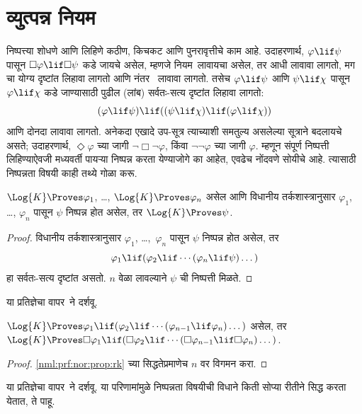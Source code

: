 \section{व्युत्पन्न नियम}\label{nml:prf:der:sec}

निष्पत्त्या शोधणे आणि लिहिणे कठीण, किचकट
आणि पुनरावृत्तीचे काम आहे. उदाहरणार्थ, $\varphi \lif \psi$
पासून $\Box \varphi \lif \Box \psi$ कडे जायचे असेल,
म्हणजे नियम~\RK लावायचा असेल, तर आधी \Nec लावावा लागतो,
मग~ चा योग्य दृष्टांत लिहावा लागतो आणि नंतर~\MP
लावावा लागतो. तसेच $\varphi \lif \psi$ आणि $\psi \lif \chi$
पासून $\varphi \lif \chi$ कडे जाण्यासाठी पुढील (लांब)
सर्वतः-सत्य दृष्टांत लिहावा लागतो:
\[(\varphi \lif \psi) \lif ((\psi \lif \chi) \lif (\varphi \lif \chi))
\]
आणि \MP{} दोनदा लावावा लागतो. अनेकदा एखादे उप-सूत्र
त्याच्याशी समतुल्य असलेल्या सूत्राने बदलायचे असते;
उदाहरणार्थ, $\Diamond
  \varphi$ च्या जागी $\lnot\Box\lnot \varphi$, किंवा
$\lnot\lnot \varphi$ च्या जागी $\varphi$. म्हणून संपूर्ण
निष्पत्ती लिहिण्याऐवजी मध्यवर्ती पायऱ्या
निष्पन्न करता येण्याजोगे का आहेत, एवढेच नोंदवणे सोयीचे आहे.
त्यासाठी निष्पन्नता विषयी काही तथ्ये गोळा करू.

\begin{prop}
  $\Log{K} \Proves \varphi_1$, \dots, $\Log{K} \Proves \varphi_n$
  असेल आणि विधानीय तर्कशास्त्रानुसार $\varphi_1$, \dots,
  $\varphi_n$ पासून $\psi$ निष्पन्न होत असेल, तर
  $\Log{K} \Proves \psi$.
\end{prop}

\begin{proof}
  विधानीय तर्कशास्त्रानुसार $\varphi_1$, \dots,~$\varphi_n$
  पासून $\psi$ निष्पन्न होत असेल, तर
  \[  \varphi_1 \lif (\varphi_2 \lif \cdots (\varphi_n \lif \psi)\dots)
  \]
  हा सर्वतः-सत्य दृष्टांत असतो. \MP{} $n$ वेळा
  लावल्याने $\psi$ ची निष्पत्ती मिळते.
\end{proof}

या प्रतिज्ञेचा वापर~\PL ने दर्शवू.

\begin{prop}
  $\Log{K} \Proves \varphi_1 \lif (\varphi_2 \lif \cdots (\varphi_{n-1} \lif
  \varphi_n)\dots)$ असेल, तर $\Log{K} \Proves \Box \varphi_1 \lif (\Box \varphi_2 \lif
  \cdots (\Box \varphi_{n-1} \lif \Box \varphi_n)\dots)$.
\end{prop}

\begin{proof}
  \ref{nml:prf:nor:prop:rk} च्या सिद्धतेप्रमाणेच
  $n$ वर विगमन करा.
\end{proof}

या प्रतिज्ञेचा वापर~\RK ने दर्शवू. या परिणामांमुळे
निष्पन्नता विषयीची विधाने किती सोप्या
रीतीने सिद्ध करता येतात, ते पाहू.

